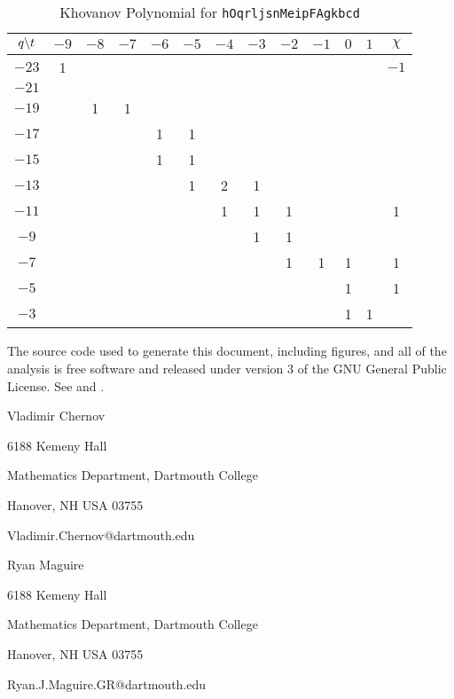 \documentclass{article}
\theoremstyle{plain}
\begin{document}
        \begin{table}
            \centering
            \begin{tabular}{| c | c | c | c | c | c | c | c | c | c | c | c | c |}
                \hline
                $q\symbol{92}t$&$-9$&$-8$&$-7$&$-6$&$-5$&$-4$&$-3$&$-2$&$-1$&$0$&$1$&$\chi$\\
                \hline
                $-23$&1&&&&&&&&&&&$-1$\\
                \hline
                $-21$&&&&&&&&&&&&\\
                \hline
                $-19$&&1&1&&&&&&&&&\\
                \hline
                $-17$&&&&1&1&&&&&&&\\
                \hline
                $-15$&&&&1&1&&&&&&&\\
                \hline
                $-13$&&&&&1&2&1&&&&&\\
                \hline
                $-11$&&&&&&1&1&1&&&&1\\
                \hline
                $-9$&&&&&&&1&1&&&&\\
                \hline
                $-7$&&&&&&&&1&1&1&&1\\
                \hline
                $-5$&&&&&&&&&&1&&1\\
                \hline
                $-3$&&&&&&&&&&1&1&\\
                \hline
            \end{tabular}
            \caption{Khovanov Polynomial for \texttt{hOqrljsnMeipFAgkbcd}}
        \end{table}
    \newpage
    
    
    \newpage
    The source code used to generate this document, including figures, and all
    of the analysis is free software and released under version 3 of the
    GNU General Public License. See
    \cite{mathematicsandphysics} and \cite{MaguireLibtmpl}.
    \par\hfill\par
    Vladimir Chernov
    \par
    6188 Kemeny Hall
    \par
    Mathematics Department, Dartmouth College
    \par
    Hanover, NH USA 03755
    \par
    Vladimir.Chernov@dartmouth.edu
    \par\hfill\par
    Ryan Maguire
    \par
    6188 Kemeny Hall
    \par
    Mathematics Department, Dartmouth College
    \par
    Hanover, NH USA 03755
    \par
    Ryan.J.Maguire.GR@dartmouth.edu
\end{document}
